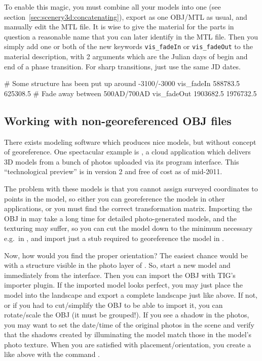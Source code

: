 To enable this magic, you must combine all your models into one (see section~\ref{sec:scenery3d:concatenating}), 
export as one OBJ/MTL as usual, and manually edit the MTL file. It is wise to give the material 
for the parts in question a reasonable name that you can later identify in the MTL file.
Then you simply add one or both of the new keywords \texttt{vis\_fadeIn} or \texttt{vis\_fadeOut} 
to the material description,  with 2 arguments which are the Julian days of begin and end of a phase transition. 
For sharp transitions, just use the same JD dates.

\begin{configfile}
# Some structure has been put up around -3100/-3000
vis_fadeIn  588783.5 625308.5
# Fade away between 500AD/700AD
vis_fadeOut 1903682.5 1976732.5
\end{configfile}
 

\subsection{Working with non-georeferenced OBJ files}
\label{sec:scenery3d:NonGeoreferenced}


There exists modeling software which produces nice models, but without
concept of georeference. One spectacular example is ,
a cloud application which delivers 3D models from a bunch of photos
uploaded via its program interface. This ``technological preview'' is
in version 2 and free of cost as of mid-2011.

The problem with these models is that you cannot assign surveyed
coordinates to points in the model, so either you can georeference the
models in other applications, or you must find the correct
transformation matrix.  Importing the OBJ in  may take a long
time for detailed photo-generated models, and the texturing may
suffer, so you can cut the model down to the minimum necessary e.g.\ in
, and import just a stub required to georeference the model in
. 

Now, how would you find the proper orientation? The easiest chance
would be with a structure visible in the photo layer of . So, start a new model and immediately  from the
 interface. Then you can import the OBJ with TIG's importer
plugin.  If the imported model looks perfect, you may just place the
model into the  landscape and export a complete landscape just
like above. If not, or if you had to cut/simplify the OBJ to be able
to import it, you can rotate/scale the OBJ (it must be grouped!). If
you see a shadow in the photos, you may want to set the date/time of
the original photos in the scene and verify that the shadows created by
 illuminating the model match those in the model's photo
texture. When you are satisfied with placement/orientation, you create
a  like above with the command
.

